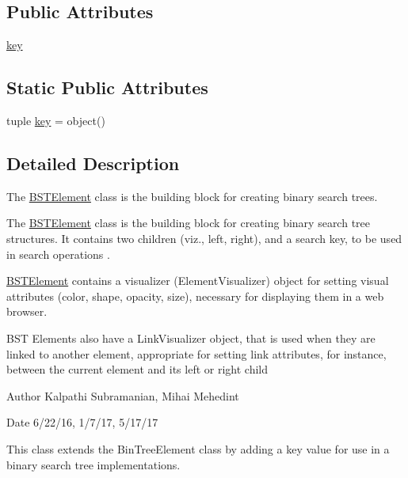 \subsection*{Public Attributes}
\begin{DoxyCompactItemize}
\item 
\hyperlink{class_bridges_1_1bst__element_1_1_b_s_t_element_a1b04a3676ac84d889491f8a496aedb91}{key}
\end{DoxyCompactItemize}
\subsection*{Static Public Attributes}
\begin{DoxyCompactItemize}
\item 
tuple \hyperlink{class_bridges_1_1bst__element_1_1_b_s_t_element_a834b1b25706d7cba9017fc3b1c637cd7}{key} = object()
\end{DoxyCompactItemize}


\subsection{Detailed Description}
The \hyperlink{class_bridges_1_1bst__element_1_1_b_s_t_element}{B\+S\+T\+Element} class is the building block for creating binary search trees. 

The \hyperlink{class_bridges_1_1bst__element_1_1_b_s_t_element}{B\+S\+T\+Element} class is the building block for creating binary search tree structures. It contains two children (viz., left, right), and a search key, to be used in search operations .

\hyperlink{class_bridges_1_1bst__element_1_1_b_s_t_element}{B\+S\+T\+Element} contains a visualizer (Element\+Visualizer) object for setting visual attributes (color, shape, opacity, size), necessary for displaying them in a web browser.

B\+S\+T Elements also have a Link\+Visualizer object, that is used when they are linked to another element, appropriate for setting link attributes, for instance, between the current element and its left or right child

\begin{DoxyAuthor}{Author}
Kalpathi Subramanian, Mihai Mehedint
\end{DoxyAuthor}
\begin{DoxyDate}{Date}
6/22/16, 1/7/17, 5/17/17
\end{DoxyDate}
This class extends the Bin\+Tree\+Element class by adding a \textquotesingle{}key\textquotesingle{} value for use in a binary search tree implementations. 

